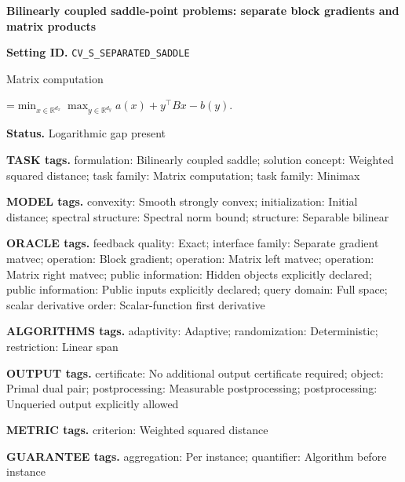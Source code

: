 \documentclass[10pt,a4paper]{article}
\newcommand{\AtlasMath}[1]{\par\begingroup\centering\setbox0=\hbox{$\displaystyle #1$}\ifdim\wd0>1.4\linewidth\typeout{ATLAS WIDE FORMULA: \the\wd0}\fi\ifdim\wd0>\linewidth\resizebox{\linewidth}{!}{\box0}\else\box0\fi\par\endgroup}
\begin{document}
\raggedright

{\LARGE\bfseries\sffamily\color{AtlasNavy} Bilinearly coupled saddle-point problems: separate block gradients and matrix products\par}\vspace{5pt}


\textbf{Setting ID.} \texttt{CV\_\allowbreak{}S\_\allowbreak{}SEPARATED\_\allowbreak{}SADDLE}



Matrix computation




\AtlasMath{\min_{x\in\mathbb{R}^{d_x}}\max_{y\in\mathbb{R}^{d_y}}a(x)+y^\top Bx-b(y).}




\textbf{Status.} Logarithmic gap present



\textbf{TASK tags.} formulation: Bilinearly coupled saddle; solution concept: Weighted squared distance; task family: Matrix computation; task family: Minimax



\textbf{MODEL tags.} convexity: Smooth strongly convex; initialization: Initial distance; spectral structure: Spectral norm bound; structure: Separable bilinear



\textbf{ORACLE tags.} feedback quality: Exact; interface family: Separate gradient matvec; operation: Block gradient; operation: Matrix left matvec; operation: Matrix right matvec; public information: Hidden objects explicitly declared; public information: Public inputs explicitly declared; query domain: Full space; scalar derivative order: Scalar-function first derivative



\textbf{ALGORITHMS tags.} adaptivity: Adaptive; randomization: Deterministic; restriction: Linear span



\textbf{OUTPUT tags.} certificate: No additional output certificate required; object: Primal dual pair; postprocessing: Measurable postprocessing; postprocessing: Unqueried output explicitly allowed



\textbf{METRIC tags.} criterion: Weighted squared distance



\textbf{GUARANTEE tags.} aggregation: Per instance; quantifier: Algorithm before instance
\end{document}

